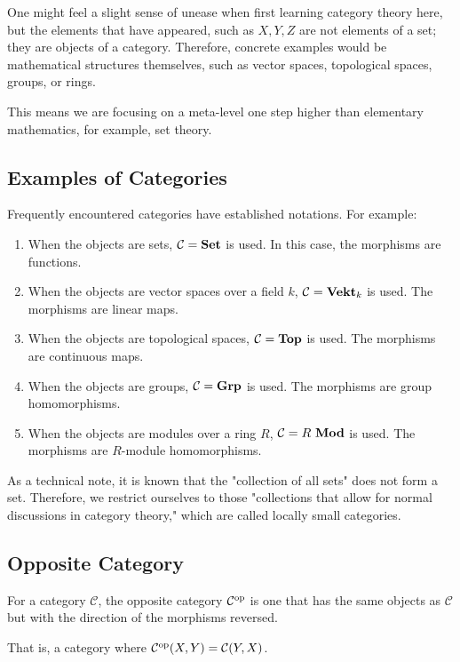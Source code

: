 \documentclass[uplatex,a4j,12pt,dvipdfmx]{jsarticle}
\begin{document}
One might feel a slight sense of unease when first learning category theory here, but the elements that have appeared, such as
$X,Y,Z$
are not elements of a set; they are objects of a category. Therefore, concrete examples would be mathematical structures themselves, such as vector spaces, topological spaces, groups, or rings.

This means we are focusing on a meta-level one step higher than elementary mathematics, for example, set theory.

\subsection{Examples of Categories}

Frequently encountered categories have established notations.
For example:

\begin{enumerate}
    \item When the objects are sets, ${\mathcal C} = {\bf Set}$ is used. In this case, the morphisms are functions.
    \item When the objects are vector spaces over a field $k$, ${\mathcal C} = {\bf Vekt}_{k}$ is used. The morphisms are linear maps.
    \item When the objects are topological spaces, ${\mathcal C} = {\bf Top}$ is used. The morphisms are continuous maps.
    \item When the objects are groups, ${\mathcal C} = {\bf Grp}$ is used. The morphisms are group homomorphisms.
    \item When the objects are modules over a ring $R$, ${\mathcal C} = R \ {\bf Mod}$ is used. The morphisms are $R$-module homomorphisms.
\end{enumerate}

As a technical note, it is known that the "collection of all sets" does not form a set.
Therefore, we restrict ourselves to those "collections that allow for normal discussions in category theory," which are called locally small categories.

\subsection{Opposite Category}

For a category ${\mathcal C}$, the opposite category ${\mathcal C}^{\rm op}$ is one that has the same objects as ${\mathcal C}$ but with the direction of the morphisms reversed.

That is, a category where ${\mathcal C}^{\rm op}(X,Y) = {\mathcal C}(Y,X)$.
\end{document}
